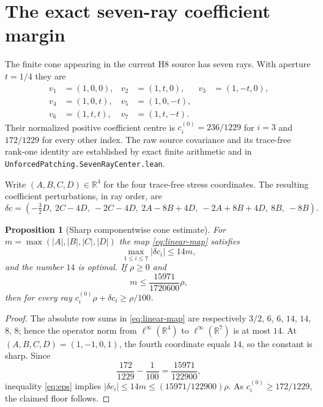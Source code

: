 \documentclass[11pt,a4paper]{article}
\theoremstyle{plain}
\newtheorem{proposition}[theorem]{Proposition}
\theoremstyle{definition}
\newcommand{\R}{\mathbb{R}}
\begin{document}
\section{The exact seven-ray coefficient margin}

The finite cone appearing in the current H8 source has seven rays.
With aperture $t=1/4$ they are
\begin{equation}\label{eq:rays}
\begin{aligned}
 v_1&=(1,0,0), &v_2&=(1,t,0),&v_3&=(1,-t,0),\\
 v_4&=(1,0,t),&v_5&=(1,0,-t),\\
 v_6&=(1,t,t),&v_7&=(1,t,-t).
\end{aligned}
\end{equation}
Their normalized positive coefficient centre is
$c^{(0)}_i=236/1229$ for $i=3$ and $172/1229$ for every other
index. The raw source covariance and its trace-free rank-one identity
are established by exact finite arithmetic and in
\texttt{UnforcedPatching.SevenRayCenter.lean}.

Write $(A,B,C,D)\in\R^4$ for the four trace-free stress coordinates.
The resulting coefficient perturbations, in ray order, are
\begin{equation}\label{eq:linear-map}
 \delta c=\left(
 -\tfrac32 D,\ 2C-4D,\ -2C-4D,\
 2A-8B+4D,\ -2A+8B+4D,\ 8B,\ -8B\right).
\end{equation}

\begin{proposition}[Sharp componentwise cone estimate]\label{prop:14}
For $m=\max(|A|,|B|,|C|,|D|)$ the map
\eqref{eq:linear-map} satisfies
\begin{equation}\label{eq:14}
 \max_{1\le i\le7}|\delta c_i|\le14m,
\end{equation}
and the number $14$ is optimal. If $\rho\ge0$ and
\begin{equation}\label{eq:eps}
 m\le\frac{15971}{1720600}\rho,
\end{equation}
then for every ray $c_i^{(0)}\rho+\delta c_i\ge\rho/100$.
\end{proposition}

\begin{proof}
The absolute row sums in \eqref{eq:linear-map} are respectively
$3/2$, $6$, $6$, $14$, $14$, $8$, $8$; hence the operator norm
from $\ell^\infty(\R^4)$ to $\ell^\infty(\R^7)$ is at most $14$.
At $(A,B,C,D)=(1,-1,0,1)$, the fourth coordinate equals $14$,
so the constant is sharp. Since
\[
 \frac{172}{1229}-\frac1{100}=\frac{15971}{122900},
\]
inequality \eqref{eq:eps} implies
$|\delta c_i|\le 14m\le(15971/122900)\rho$.
As $c_i^{(0)}\ge172/1229$, the claimed floor follows.
\end{proof}
\end{document}
